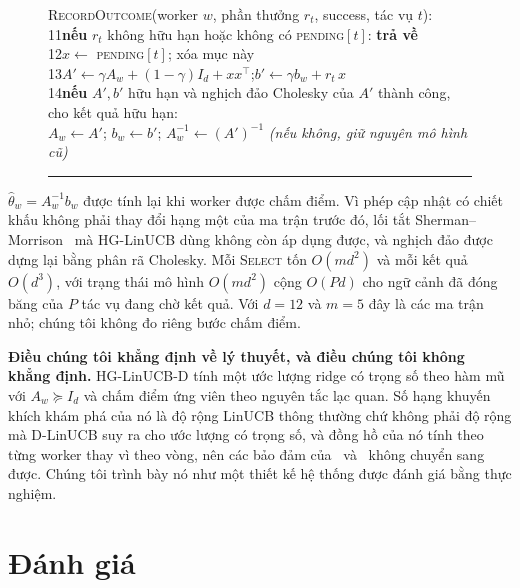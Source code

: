 \documentclass[final,5p,times,twocolumn]{elsarticle}
\begin{document}
\begin{figure}[t]
\begin{minipage}{\columnwidth}
\noindent\textsc{RecordOutcome}(worker $w$, phần thưởng $r_t$, success, tác vụ $t$):\\
\hspace*{0.3em}11\quad \textbf{nếu} $r_t$ không hữu hạn hoặc không có \textsc{pending}$[t]$: \textbf{trả về}\\
\hspace*{0.3em}12\quad $x\leftarrow$ \textsc{pending}$[t]$; xóa mục này\\
\hspace*{0.3em}13\quad $A'\leftarrow\gamma A_w+(1-\gamma)I_d+xx^\top$;\quad $b'\leftarrow\gamma b_w+r_t\,x$\\
\hspace*{0.3em}14\quad \textbf{nếu} $A',b'$ hữu hạn và nghịch đảo Cholesky của $A'$ thành công, cho kết quả hữu hạn:\\
\hspace*{2.2em}$A_w\leftarrow A'$; $b_w\leftarrow b'$; $A_w^{-1}\leftarrow(A')^{-1}$ \textit{(nếu không, giữ nguyên mô hình cũ)}
\vspace{3pt}\hrule
\end{minipage}
\end{figure}

$\hat\theta_w=A_w^{-1}b_w$ được tính lại khi worker được chấm điểm. Vì phép cập nhật có chiết khấu không phải thay đổi hạng một của ma trận trước đó, lối tắt Sherman--Morrison~\cite{sherman1950} mà HG-LinUCB dùng không còn áp dụng được, và nghịch đảo được dựng lại bằng phân rã Cholesky. Mỗi \textsc{Select} tốn $O(md^2)$ và mỗi kết quả $O(d^3)$, với trạng thái mô hình $O(md^2)$ cộng $O(Pd)$ cho ngữ cảnh đã đóng băng của $P$ tác vụ đang chờ kết quả. Với $d=12$ và $m=5$ đây là các ma trận nhỏ; chúng tôi không đo riêng bước chấm điểm.

\textbf{Điều chúng tôi khẳng định về lý thuyết, và điều chúng tôi không khẳng định.} HG-LinUCB-D tính một ước lượng ridge có trọng số theo hàm mũ với $A_w\succeq I_d$ và chấm điểm ứng viên theo nguyên tắc lạc quan. Số hạng khuyến khích khám phá của nó là độ rộng LinUCB thông thường chứ không phải độ rộng mà D-LinUCB suy ra cho ước lượng có trọng số, và đồng hồ của nó tính theo từng worker thay vì theo vòng, nên các bảo đảm của~\cite{russac2019} và~\cite{chu2011} không chuyển sang được. Chúng tôi trình bày nó như một thiết kế hệ thống được đánh giá bằng thực nghiệm.

\section{Đánh giá}
\label{sec:eval}
\end{document}
